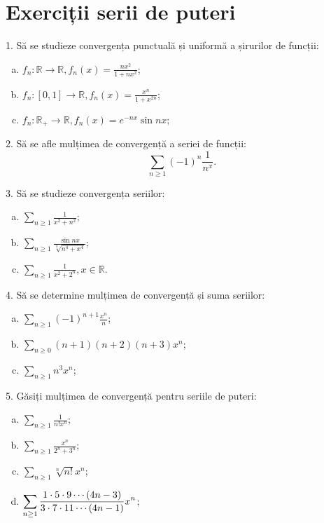 \documentclass[11pt,a4paper]{article}
\newcommand\ds{\displaystyle}
\newcommand\RR{\mathbb{R}}
\theoremstyle{dotless}
\theoremstyle{dotlessdr}
\begin{document}
\section{Exerciții serii de puteri}
\label{sec:ex}

1. Să se studieze convergența punctuală și uniformă a șirurilor de funcții:
\begin{enumerate}[(a)]
\item $f_n : \RR \to \RR, f_n(x) = \frac{nx^2}{1 + nx^2}$;
\item $f_n : [0, 1] \to \RR, f_n(x) = \frac{x^n}{1 + x^{2n}}$;
\item $f_n : \RR_+ \to \RR, f_n(x) = e^{-nx} \sin nx$;
\end{enumerate}

\vspace{1cm}

2. Să se afle mulțimea de convergență a seriei de funcții:
\[
  \sum_{n \geq 1} (-1)^n \frac{1}{n^x}.
\]

\vspace{1cm}

3. Să se studieze convergența seriilor:
\begin{enumerate}[(a)]
\item $\ds\sum_{n \geq 1} \frac{1}{x^2 + n^2}$;
\item $\ds\sum_{n \geq 1} \frac{\sin nx}{\sqrt[3]{n^4 + x^4}}$;
\item $\ds\sum_{n \geq 1} \frac{1}{x^2 + 2^n}, x \in \RR$.
\end{enumerate}

\vspace{1cm}

4. Să se determine mulțimea de convergență și suma seriilor:
\begin{enumerate}[(a)]
\item $\ds \sum_{n \geq 1} (-1)^{n + 1} \frac{x^n}{n}$;
\item $\ds \sum_{n \geq 0} (n + 1)(n + 2)(n + 3) x^n$;
\item $\ds \sum_{n \geq 1} n^3 x^n$;
\end{enumerate}

\vspace{1cm}

5. Găsiți mulțimea de convergență pentru seriile de puteri:
\begin{enumerate}[(a)]
\item $\ds\sum_{n \geq 1} \frac{1}{n! x^n}$;
\item $\ds\sum_{n \geq 1} \frac{x^n}{2^n + 3^n}$;
\item $\ds\sum_{n \geq 1} \sqrt[n]{n!} x^n$;
\item $\ds\sum_{n \geq 1} \frac{1 \cdot 5 \cdot 9 \cdots (4n - 3)}{ %
    3 \cdot 7 \cdot 11 \cdots (4n - 1)} x^n$;
\end{enumerate}
\end{document}
